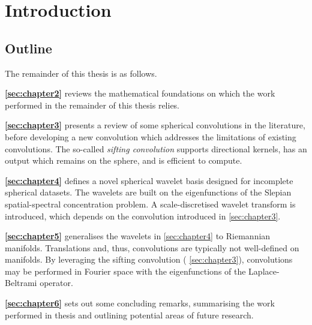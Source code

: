 \chapter{Introduction}\label{sec:chapter1}

\section{Outline}

The remainder of this thesis is as follows.

\begin{hangparas}{24pt}{1}
	\textbf{\cref{sec:chapter2}} reviews the mathematical foundations on which the work performed in the remainder of this thesis relies.

	\textbf{\cref{sec:chapter3}} presents a review of some spherical convolutions in the literature, before developing a new convolution which addresses the limitations of existing convolutions.
	The so-called \emph{sifting convolution} supports directional kernels, has an output which remains on the sphere, and is efficient to compute.

	\textbf{\cref{sec:chapter4}} defines a novel spherical wavelet basis designed for incomplete spherical datasets.
	The wavelets are built on the eigenfunctions of the Slepian spatial-spectral concentration problem.
	A scale-discretised wavelet transform is introduced, which depends on the convolution introduced in \cref{sec:chapter3}.

	\textbf{\cref{sec:chapter5}} generalises the wavelets in \cref{sec:chapter4} to Riemannian manifolds.
	Translations and, thus, convolutions are typically not well-defined on manifolds.
	By leveraging the sifting convolution (\cf{} \cref{sec:chapter3}), convolutions may be performed in Fourier space with the eigenfunctions of the Laplace-Beltrami operator.

	\textbf{\cref{sec:chapter6}} sets out some concluding remarks, summarising the work performed in thesis and outlining potential areas of future research.
\end{hangparas}

